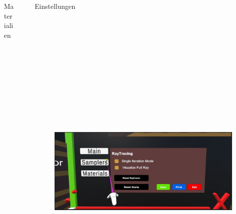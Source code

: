\documentclass[final,hyperref={pdfpagelabels=false}]{beamer}
\begin{document}
\begin{frame}[t]
\begin{columns}[t]
\begin{column}{.4675\textwidth}
\begin{block}{Materialien}

\end{block}


\end{column} %



\begin{column}{.02\textwidth}\end{column} %

\begin{column}{.465\textwidth}

\begin{block}{Einstellungen}
   \begin{figure}
   	  \includegraphics[height=16.5cm]{settings}
   \end{figure}
   

\end{block}
\end{column}
\end{columns}
\end{frame}
\end{document}
